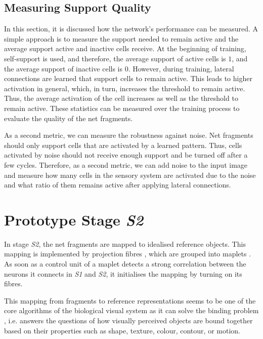 \subsection{Measuring Support Quality}
In this section, it is discussed how the network's performance can be measured.
A simple approach is to measure the support needed to remain active and the average support active and inactive cells receive.
At the beginning of training, self-support is used, and therefore, the average support of active cells is $1$, and the average support of inactive cells is $0$.
However, during training, lateral connections are learned that support cells to remain active.
This leads to higher activation in general, which, in turn, increases the threshold to remain active.
Thus, the average activation of the cell increases as well as the threshold to remain active.
These statistics can be measured over the training process to evaluate the quality of the net fragments.

As a second metric, we can measure the robustness against noise.
Net fragments should only support cells that are activated by a learned pattern. Thus, cells activated by noise should not receive enough support and be turned off after a few cycles.
Therefore, as a second metric, we can add noise to the input image and measure how many cells in the sensory system are activated due to the noise and what ratio of them remains active after applying lateral connections.


\section{Prototype Stage \emph{S2}}
In stage \emph{S2}, the net fragments are mapped to idealised reference objects.
This mapping is implemented by projection fibres \cite{tanigawa_organization_2005, greig_molecular_2013}, which are grouped into maplets .
As soon as a control unit of a maplet detects a strong correlation between the neurons it connects in \emph{S1} and \emph{S2}, it initialises the mapping by turning on its fibres.

This mapping from fragments to reference representations seems to be one of the core algorithms of the biological visual system as it can solve the binding problem , i.e. answers the questions of how visually perceived objects are bound together based on their properties such as shape, texture, colour, contour, or motion.

